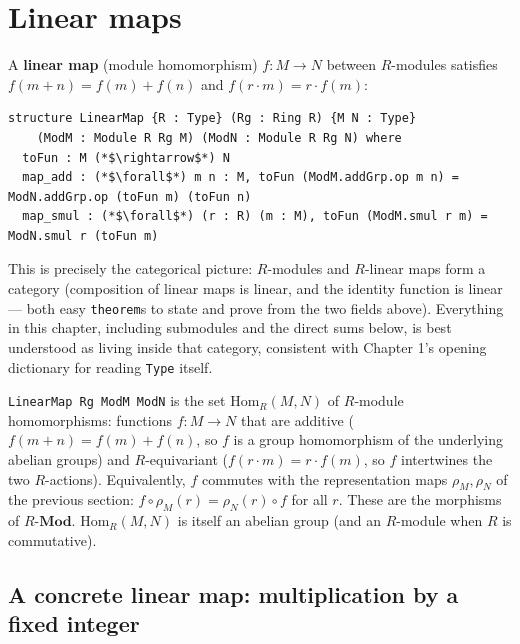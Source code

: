 \section{Linear maps}\label{sec:10-modules:05-linear-maps:1}

A \textbf{linear map} (module homomorphism) \(f : M \to N\) between \(R\)-modules satisfies \(f(m+n) = f(m) + f(n)\) and \(f(r \cdot m) = r \cdot f(m)\):

\begin{lstlisting}
structure LinearMap {R : Type} (Rg : Ring R) {M N : Type}
    (ModM : Module R Rg M) (ModN : Module R Rg N) where
  toFun : M (*$\rightarrow$*) N
  map_add : (*$\forall$*) m n : M, toFun (ModM.addGrp.op m n) = ModN.addGrp.op (toFun m) (toFun n)
  map_smul : (*$\forall$*) (r : R) (m : M), toFun (ModM.smul r m) = ModN.smul r (toFun m)
\end{lstlisting}

This is precisely the categorical picture: \(R\)-modules and \(R\)-linear maps form a category (composition of linear maps is linear, and the identity function is linear --- both easy \texttt{theorem}s to state and prove from the two fields above). Everything in this chapter, including submodules and the direct sums below, is best understood as living inside that category, consistent with Chapter 1's opening dictionary for reading \texttt{Type} itself.

\begin{mathreading}

\texttt{LinearMap Rg ModM ModN} is the set \(\mathrm{Hom}_R(M, N)\) of \(R\)-module homomorphisms: functions \(f : M \to N\) that are additive (\(f(m+n) = f(m)+f(n)\), so \(f\) is a group homomorphism of the underlying abelian groups) and \(R\)-equivariant (\(f(r\cdot m) = r\cdot
f(m)\), so \(f\) intertwines the two \(R\)-actions). Equivalently, \(f\) commutes with the representation maps \(\rho_M, \rho_N\) of the previous section: \(f\circ\rho_M(r) = \rho_N(r)\circ f\) for all \(r\). These are the morphisms of \(R\text{-}\mathbf{Mod}\). \(\mathrm{Hom}_R(M,N)\) is itself an abelian group (and an \(R\)-module when \(R\) is commutative).

\end{mathreading}

\subsection{A concrete linear map: multiplication by a fixed integer}\label{sec:10-modules:05-linear-maps:2}

